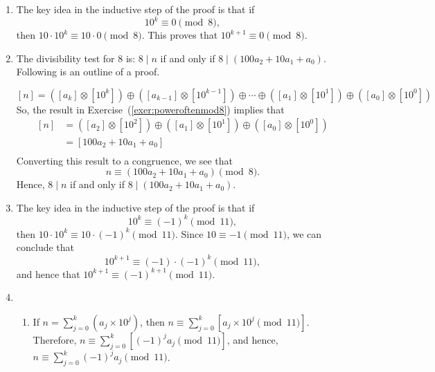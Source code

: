 \begin{enumerate}
\item The key idea in the inductive step of the proof is that if
\[
10^k \equiv 0 \pmod 8,
\]
then $10 \cdot 10^k \equiv 10 \cdot 0 \pmod 8$.  This proves that $10^{k+1} \equiv 0 \pmod 8$.

\item The divisibility test for 8 is:   $8 \mid n$ if and only if  
$8 \mid \left( {100a_2 + 10a_1  + a_0 } \right)$.  Following is an outline of a proof.

\[
  \left[ n \right] = \left( {\left[ {a_k } \right] \otimes \left[ {10^k } \right]} \right) \oplus \left( {\left[ {a_{k - 1} } \right] \otimes \left[ {10^{k - 1} } \right]} \right) \oplus  \cdots  \oplus \left( {\left[ {a_1 } \right] \otimes \left[ {10^1 } \right]} \right) \oplus \left( {\left[ {a_0 } \right] \otimes \left[ {10^0 } \right]} \right)
\]
So, the result in Exercise~(\ref{exer:poweroftenmod8}) implies that
\[
\begin{aligned}
  \left[ n \right] &= \left( {\left[ {a_2 } \right] \otimes \left[ {10^2 } \right]} \right) \oplus \left( {\left[ {a_1 } \right] \otimes \left[ {10^1 } \right]} \right) \oplus \left( {\left[ {a_0 } \right] \otimes \left[ {10^0 } \right]} \right) \\ 
   &= \left[ {100a_2 + 10a_1  + a_0 } \right] \\ 
\end{aligned}
\]
Converting this result to a congruence, we see that  
\[
n \equiv \left( {100a_2 + 10a_1  + a_0 } \right) \pmod 8.
\]
Hence, $8 \mid n$ if and only if $8 \mid \left( {100a_2 + 10a_1  + a_0 } \right)$.




\item The key idea in the inductive step of the proof is that if
\[
10^k \equiv \left( -1 \right)^k \pmod {11},
\]
then $10 \cdot 10^k \equiv 10 \cdot \left( -1 \right)^k \pmod {11}$.  Since 
$10 \equiv -1 \pmod {11}$, we can conclude that
\[
10^{k+1} \equiv \left( -1 \right) \cdot \left( -1 \right)^k \pmod {11},
\]
and hence that $10^{k+1} \equiv \left( -1 \right)^{k+1} \pmod {11}$.

\item \begin{enumerate}
\item If  $n = \sum\limits_{j = 0}^k \left( {a_j \times 10^j} \right)$, then 
$n \equiv \sum\limits_{j = 0}^k \left[ { a_j \times 10^j \pmod {11}} \right]$. Therefore,  
$n \equiv \sum\limits_{j = 0}^k \left[ {\left( { - 1} \right)^j a_j } \pmod {11} \right]$, and hence, \\$n \equiv \sum\limits_{j = 0}^k {\left( { - 1} \right)^j a_j } \pmod {11}$.


\end{enumerate}
\end{enumerate}
